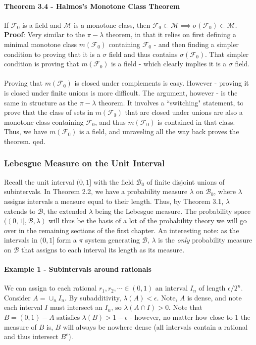 \documentclass[12pt,a4paper]{article}
\newcommand{\1}[1]{\mathbbm{1}\left\{ #1 \right\}}
\newcommand{\fcal}{\mathcal{F}}
\newcommand{\bcal}{\mathcal{B}}
\newcommand{\mcal}{\mathcal{M}}
\begin{document}
\paragraph{Theorem 3.4 - Halmos's Monotone Class Theorem} If $\fcal_0$ is a field and $\mcal$ is a monotone class, then $\fcal_0 \subset \mcal \implies \sigma(\fcal_0) \subset \mcal$. \textbf{Proof}: Very similar to the $\pi-\lambda$ theorem, in that it relies on first defining a minimal monotone class $m(\fcal_0)$ containing $\fcal_0$ - and then finding a simpler condition to proving that it is a $\sigma$ field and thus contains $\sigma(\fcal_0)$. That simpler condition is proving that $m(\fcal_0)$ is a field - which clearly implies it is a $\sigma$ field.
\\\\
Proving that $m(\fcal_0)$ is closed under complements is easy. However - proving it is closed under finite unions is more difficult. The argument, however - is the same in structure as the $\pi-\lambda$ theorem. It involves a ``switching" statement, to prove that the class of sets in $m(\fcal_0)$ that are closed under unions are also a monotone class containing $\fcal_0$, and thus $m(\fcal_0)$ is contained in that class. Thus, we have $m(\fcal_0)$ is a field, and unraveling all the way back proves the theorem. qed.

\subsubsection{Lebesgue Measure on the Unit Interval}
Recall the unit interval $(0,1]$ with the field $\bcal_0$ of finite disjoint unions of subintervals. In Theorem 2.2, we have a probability measure $\lambda$ on $\bcal_0$, where $\lambda$ assigns intervals a measure equal to their length. Thus, by Theorem 3.1, $\lambda$ extends to $\bcal$, the extended $\lambda$ being the Lebesgue measure. The probability space $((0,1],\bcal,\lambda)$ will thus be the basis of a lot of the probability theory we will go over in the remaining sections of the first chapter. An interesting note: as the intervals in $(0,1]$ form a $\pi$ system generating $\bcal$, $\lambda$ is the \textit{only} probability measure on $\bcal$ that assigns to each interval its length as its measure.

\paragraph{Example 1 - Subintervals around rationals} We can assign to each rational $r_1, r_2, \cdots \in (0,1)$ an interval $I_n$ of length $\epsilon/2^n$. Consider $A = \cup_n I_n$. By subadditivity, $\lambda(A) < \epsilon$. Note, $A$ is dense, and note each interval $I$ must intersect an $I_n$, so $\lambda(A \cap I) > 0$. Note that $B = (0,1) - A$ satisfies $\lambda(B) > 1-\epsilon$ - however, no matter how close to $1$ the measure of $B$ is, $B$ will always be nowhere dense (all intervals contain a rational and thus intersect $B^c$).
\end{document}
